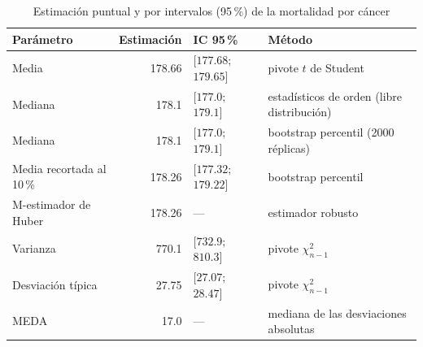 \begin{table}[htbp]
\centering
\small
\caption{Estimación puntual y por intervalos (95\,\%) de la mortalidad por cáncer}\label{tab:respuesta}
\begin{tabularx}{\linewidth}{l r l >{\raggedright\arraybackslash}X}
\toprule
Parámetro & Estimación & IC 95\,\% & Método \\
\midrule
Media & \num{178.66} & $[\num{177.68};$\allowbreak\ $\num{179.65}]$ & pivote $t$ de Student \\
Mediana & \num{178.1} & $[\num{177.0};$\allowbreak\ $\num{179.1}]$ & estadísticos de orden (libre distribución) \\
Mediana & \num{178.1} & $[\num{177.0};$\allowbreak\ $\num{179.1}]$ & bootstrap percentil (\num{2000} réplicas) \\
Media recortada al 10\,\% & \num{178.26} & $[\num{177.32};$\allowbreak\ $\num{179.22}]$ & bootstrap percentil \\
M-estimador de Huber & \num{178.26} & --- & estimador robusto \\
Varianza & \num{770.1} & $[\num{732.9};$\allowbreak\ $\num{810.3}]$ & pivote $\chi^2_{n-1}$ \\
Desviación típica & \num{27.75} & $[\num{27.07};$\allowbreak\ $\num{28.47}]$ & pivote $\chi^2_{n-1}$ \\
MEDA & \num{17.0} & --- & mediana de las desviaciones absolutas \\
\bottomrule
\end{tabularx}

\end{table}
